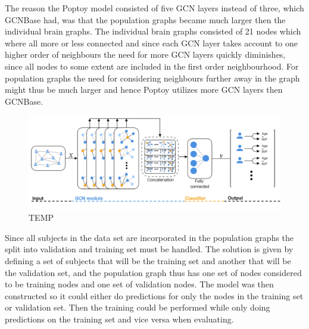 The reason the Poptoy model consisted of five GCN layers instead of three, which GCNBase had, was that the population graphs became much larger then the individual brain graphs. The individual brain graphs consisted of 21 nodes which where all more or less connected and since each GCN layer takes account to one higher order of neighbours the need for more GCN layers quickly diminishes, since all nodes to some extent are included in the first order neighbourhood. For population graphs the need for considering neighbours further away in the graph might thus be much larger and hence Poptoy utilizes more GCN layers then GCNBase. 

\begin{figure}[H]
    \centering
    \includegraphics[width=\textwidth]{chapters/images_methods/poptoy_v2.png}
    \caption{TEMP}
    \label{fig:poptoy}
\end{figure}

Since all subjects in the data set are incorporated in the population graphs the split into validation and training set must be handled. The solution is given by defining a set of subjects that will be the training set and another that will be the validation set, and the population graph thus has one set of nodes considered to be training nodes and one set of validation nodes. The model was then constructed so it could either do predictions for only the nodes in the training set or validation set. Then the training could be performed while only doing predictions on the training set and vice versa when evaluating.

